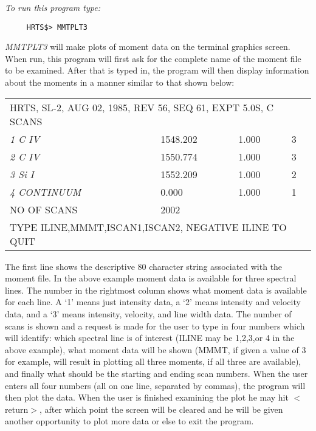 {\em To run this program type:}
\begin{verbatim}
     HRTS$> MMTPLT3
\end{verbatim}
  {\em MMTPLT3} will make plots of moment data on the terminal graphics
   screen.  When run, this program will first ask for the complete name of
   the moment file to be examined.  After that is typed in, the program
   will then display information about the moments in a manner similar to
   that shown below:
\begin{center}
\begin{tabular}{||l l l l l ||}
\hline
\multicolumn{5}{||l||}{HRTS, SL-2, AUG 02, 1985, REV 56, SEQ 61, EXPT 5.0S,
C SCANS} \\
          {\em 1  C IV}  &      &      1548.202  &   1.000  &  3 \\
          {\em 2  C IV}  &      &      1550.774  &   1.000  &  3 \\
          {\em 3  Si I}  &      &      1552.209  &   1.000  &  2 \\
          {\em 4  CONTINUUM} &  &      0.000     &   1.000  &  1 \\
\multicolumn{2}{||l}{NO OF SCANS} & \multicolumn{3}{l||}{2002} \\
\multicolumn{5}{||l||}{TYPE ILINE,MMMT,ISCAN1,ISCAN2, NEGATIVE ILINE TO QUIT} \\
\hline
\end{tabular}
\end{center}
   The first line shows the descriptive 80 character string associated
   with the moment file.  In the above example moment data is available
   for three spectral lines.  The number in the rightmost column shows
   what moment data is available for each line.  A `1' means just
   intensity data, a `2' means intensity and velocity data, and a `3'
   means intensity, velocity, and line width data.  The number of scans is
   shown and a request is made for the user to type in four numbers which
   will identify:  which spectral line is of interest (ILINE may be
   1,2,3,or 4 in the above example), what moment data will be shown (MMMT,
   if given a value of 3 for example, will result in plotting all three
   moments, if all three are available), and finally what should be the
   starting and ending scan numbers. When the user enters all four numbers
  (all on one line, separated by commas), the program will then plot the
   data.  When the user is finished examining the plot he may hit
   $<$return$>$,
   after which point the screen will be cleared and he will be given
   another opportunity to plot more data or else to exit the program.

